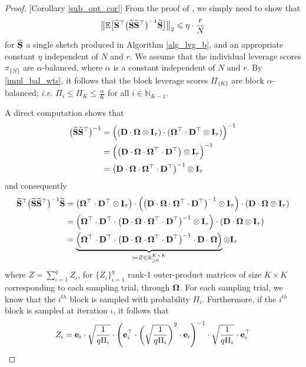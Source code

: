 \documentclass[journal,letterpaper,onecolumn,twoside,nofonttune]{IEEEtran}
\newcommand{\N}{\mathbb{N}}
\newcommand{\R}{\mathbb{R}}
\newcommand{\E}{\mathbb{E}}
\newcommand{\eb}{\bold{e}}
\newcommand{\Db}{\bold{D}}
\newcommand{\Ib}{\bold{I}}
\newcommand{\Sb}{\bold{S}}
\newcommand{\Sbwt}{\widetilde{\Sb}}
\newcommand{\Omb}{\bold{\Omega}}
\begin{document}
\begin{proof}{[Corollary \ref{sub_opt_cor}]}
From the proof of {\cite[Theorem 1]{PW16}}, we simply need to show that
$$ \big\|\E\big[\Sbwt^\top\big(\Sbwt\Sbwt^\top\big)^{-1}\Sbwt\big]\big\|_2\leqslant\eta\cdot\frac{r}{N} $$
for $\Sbwt$ a single sketch produced in Algorithm \ref{alg_lvg_b}, and an appropriate constant $\eta$ independent of $N$ and $r$. We assume that the individual leverage scores $\pi_{\{N\}}$ are $\alpha$-balanced, where $\alpha$ is a constant independent of $N$ and $r$. By \eqref{impl_bal_wts}, it follows that the block leverage scores $\Pi_{\{K\}}$ are block $\alpha$-balanced; \textit{i.e.} $\Pi_i\leqslant \Pi_K \leqslant \frac{\alpha}{K}$ for all $i\in\N_{K-1}$.

A direct computation shows that
\begin{align*}
  \big(\Sbwt\Sbwt^\top\big)^{-1} &= \Big((\Db\cdot\Omb\otimes\Ib_\tau)\cdot(\Omb^\top\cdot\Db^\top\otimes\Ib_\tau)\Big)^{-1}\\
  &= \Big(\big(\Db\cdot\Omb\cdot\Omb^\top\cdot\Db^\top\big)\otimes\Ib_\tau\Big)^{-1}\\
  &= \big(\Db\cdot\Omb\cdot\Omb^\top\cdot\Db^\top\big)^{-1}\otimes\Ib_\tau
\end{align*}
and consequently
\begin{align*}
  \Sbwt^\top\big(\Sbwt\Sbwt^\top\big)^{-1}\Sbwt &= \big(\Omb^\top\cdot\Db^\top\otimes\Ib_\tau\big) \cdot \Big(\big(\Db\cdot\Omb\cdot\Omb^\top\cdot\Db^\top\big)^{-1}\otimes\Ib_\tau\Big)\cdot(\Db\cdot\Omb\otimes\Ib_\tau) \\
  &= \Big(\Omb^\top\cdot\Db^\top \cdot \big(\Db\cdot\Omb\cdot\Omb^\top\cdot\Db^\top\big)^{-1}\otimes\Ib_\tau\Big)\cdot(\Db\cdot\Omb\otimes\Ib_\tau) \\
  &= \underbrace{\Big(\Omb^\top\cdot\Db^\top \cdot \big(\Db\cdot\Omb\cdot\Omb^\top\cdot\Db^\top\big)^{-1}\cdot\Db\cdot\Omb\Big)}_{\coloneqq Z\in\R_{\geqslant0}^{K\times K}}\otimes\Ib_\tau \\
\end{align*}
where $Z=\sum_{\iota=1}^qZ_\iota$, for $\{Z_\iota\}_{\iota=1}^q$ rank-1 outer-product matrices of size $K\times K$ corresponding to each sampling trial, through $\Omb$. For each sampling trial, we know that the $i^{th}$ block is sampled with probability $\Pi_i$. Furthermore, if the $i^{th}$ block is sampled at iteration $\iota$, it follows that
\begin{align*}
  Z_\iota &= \eb_i\cdot\sqrt{\frac{1}{q\Pi_i}}\cdot\left(\eb_i^\top\cdot\left(\sqrt{\frac{1}{q\Pi_i}}\right)^2\cdot\eb_i\right)^{-1}\cdot\sqrt{\frac{1}{q\Pi_i}}\cdot\eb_i^\top \\

\end{align*}
\end{proof}
\end{document}
